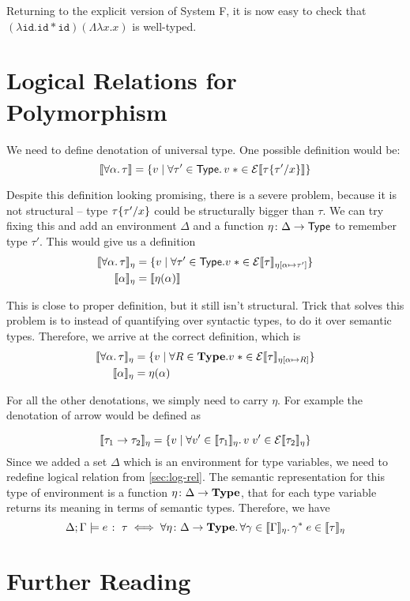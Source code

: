 Returning to the explicit version of System F, it is now easy to check that
$(\lambda \texttt{id}. \texttt{id}*\texttt{id}) (\Lambda \lambda x. x)$ is well-typed.
\section{Logical Relations for Polymorphism}
We need to define denotation of universal type.
One possible definition would be:
\[
  \llbracket\forall\alpha\ldotp\tau\rrbracket = \{ v \mid \forall \tau' \in\mathsf{Type}
    \ldotp v\;*\in \mathcal E \llbracket\tau\{\tau'/x\}\rrbracket \}
\]

Despite this definition looking promising, there is a severe problem,
because it is not structural -- type $\tau\{\tau'/x\}$ could be structurally
bigger than $\tau$. We can try fixing this and add an environment $\Delta$ and
a function $\eta\colon\Delta\to\mathsf{Type}$ to remember type $\tau'$.
This would give us a definition
\begin{alignat*}{2}
  \llbracket\forall\alpha\ldotp\tau\rrbracket_{\eta} & = \{ v \mid
    \forall \tau' \in \mathsf{Type}.
      v\;* \in \mathcal{E}\llbracket\tau\rrbracket_{\eta[\alpha \mapsto \tau']} \} \\
  \llbracket\alpha\rrbracket_{\eta} & = \llbracket\eta(\alpha)\rrbracket
\end{alignat*}

This is close to proper definition, but it still isn't structural.
Trick that solves this problem is to instead of quantifying over
syntactic types, to do it over semantic types.
Therefore, we arrive at the correct definition, which is
\begin{alignat*}{2}
  \llbracket\forall\alpha\ldotp\tau\rrbracket_{\eta} & = \{ v \mid
    \forall R \in \textbf{Type}.
      v\;* \in \mathcal{E}\llbracket\tau\rrbracket_{\eta[\alpha \mapsto R]} \} \\
  \llbracket\alpha\rrbracket_{\eta} & = \eta(\alpha)
\end{alignat*}

For all the other denotations, we simply need to carry $\eta$.
For example the denotation of arrow would be defined as

\[
  \llbracket\tau_1 \to \tau_2\rrbracket_\eta = \{ v \mid
    \forall v' \in \llbracket\tau_1\rrbracket_\eta\ldotp
      v\;v' \in \mathcal{E}\llbracket\tau_2\rrbracket_\eta \} \\\\
\]
Since we added a set $\Delta$ which is an environment for type variables,
we need to redefine logical relation from \autoref{sec:log-rel}.
The semantic representation for this type of environment is a function
$\eta\colon\Delta\to\textbf{Type}$, that for each type variable returns
its meaning in terms of semantic types. Therefore, we have
\[
  \Delta; \Gamma\models e \;\colon\; \tau \iff
    \forall \eta\colon\Delta\to\textbf{Type}\ldotp
      \forall \gamma\in\llbracket\Gamma\rrbracket_\eta\ldotp
        \gamma^*\;e \in\llbracket\tau\rrbracket_\eta
\]

\section{Further Reading}
